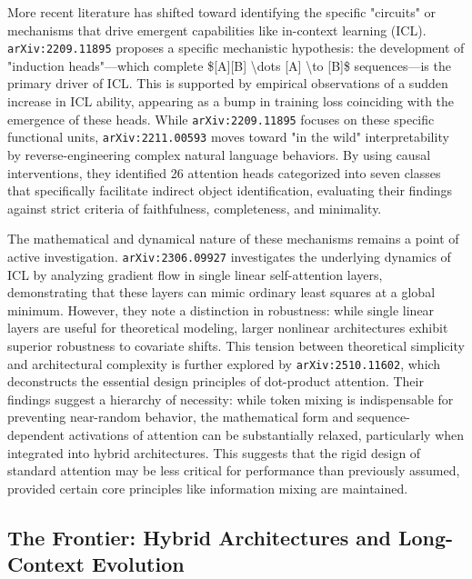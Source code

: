 \documentclass[11pt]{article}
\begin{document}
More recent literature has shifted toward identifying the specific "circuits" or mechanisms that drive emergent capabilities like in-context learning (ICL). \texttt{arXiv:2209.11895} proposes a specific mechanistic hypothesis: the development of "induction heads"—which complete \$[A][B] \textbackslash{}dots [A] \textbackslash{}to [B]\$ sequences—is the primary driver of ICL. This is supported by empirical observations of a sudden increase in ICL ability, appearing as a bump in training loss coinciding with the emergence of these heads. While \texttt{arXiv:2209.11895} focuses on these specific functional units, \texttt{arXiv:2211.00593} moves toward "in the wild" interpretability by reverse-engineering complex natural language behaviors. By using causal interventions, they identified 26 attention heads categorized into seven classes that specifically facilitate indirect object identification, evaluating their findings against strict criteria of faithfulness, completeness, and minimality.

The mathematical and dynamical nature of these mechanisms remains a point of active investigation. \texttt{arXiv:2306.09927} investigates the underlying dynamics of ICL by analyzing gradient flow in single linear self-attention layers, demonstrating that these layers can mimic ordinary least squares at a global minimum. However, they note a distinction in robustness: while single linear layers are useful for theoretical modeling, larger nonlinear architectures exhibit superior robustness to covariate shifts. This tension between theoretical simplicity and architectural complexity is further explored by \texttt{arXiv:2510.11602}, which deconstructs the essential design principles of dot-product attention. Their findings suggest a hierarchy of necessity: while token mixing is indispensable for preventing near-random behavior, the mathematical form and sequence-dependent activations of attention can be substantially relaxed, particularly when integrated into hybrid architectures. This suggests that the rigid design of standard attention may be less critical for performance than previously assumed, provided certain core principles like information mixing are maintained.

\subsection{The Frontier: Hybrid Architectures and Long-Context Evolution}
\end{document}
